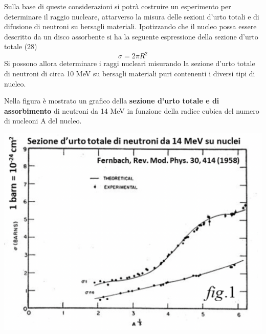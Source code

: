 Sulla base di queste considerazioni si potrà costruire un esperimento
per determinare il raggio nucleare, attarverso la misura delle sezioni
d'urto totali e di difusione di neutroni su bersagli materiali.
Ipotizzando che il nucleo possa essere descritto da un disco assorbente
si ha la seguente espressione della sezione d'urto totale (\(28\))
\[
	\sigma = 2 \pi R^2
\]
Si possono allora determinare i raggi nucleari misurando la sezione
d'urto totale di neutroni di circa 10 MeV su bersagli materiali puri
contenenti i diversi tipi di nucleo.

Nella figura è mostrato un grafico della \textbf{sezione d'urto totale e
di assorbimento} di neutroni da 14 MeV in funzione della radice cubica
del numero di nucleoni A del nucleo.
\begin{marginfigure}
	\includegraphics[width = 1.35 \textwidth, height = 1.35 \textheight]{figs/grafico-cross-sect-neutroni}
	\label{fig:cross-section-neutroni}
\end{marginfigure}

